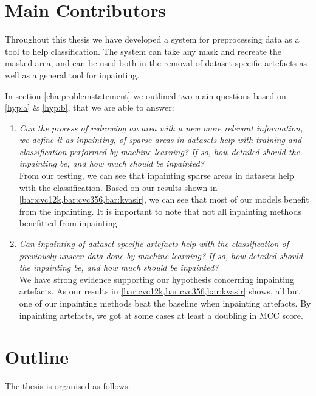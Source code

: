 \section{Main Contributors}
Throughout this thesis we have developed a system for preprocessing data as a tool to help classification. 
The system can take any mask and recreate the masked area, and can be used both in the removal of dataset specific artefacts as well as a general tool for inpainting. 

In section \ref{cha:problemstatement} we outlined two main questions based on \ref{hyp:a} \& \ref{hyp:b}, that we are able to answer:
\begin{enumerate}


\item \textit{Can the process of redrawing an area with a new more relevant information, we define it as inpainting, of sparse areas in datasets help with training and classification performed by machine learning? If so, how detailed should the inpainting be, and how much should be inpainted?}\\

From our testing, we can see that inpainting sparse areas in datasets help with the classification. Based on our results shown in \cref{bar:cvc12k,bar:cvc356,bar:kvasir}, we can see that most of our models benefit from the inpainting. It is important to note that not all inpainting methods benefitted from inpainting.



\item \textit{Can inpainting of dataset-specific artefacts help with the classification of previously unseen data done by machine learning? If so, how detailed should the inpainting be, and how much should be inpainted?}\\


We have strong evidence supporting our hypothesis concerning inpainting artefacts. As our results in \cref{bar:cvc12k,bar:cvc356,bar:kvasir} shows, all but one of our inpainting methods beat the baseline when inpainting artefacts. By inpainting artefacts, we got at some cases at least a doubling in MCC score.

\end{enumerate}


\section{Outline}
The thesis is organised as follows:

